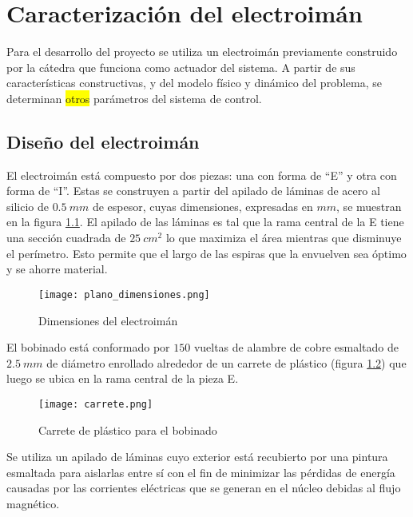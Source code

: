 \chapter{Caracterización del  electroimán}  \label{cap:CaracterizacionElectroiman}

\noindent Para el desarrollo del proyecto se utiliza un electroimán previamente construido por la cátedra que funciona como actuador del sistema. A partir de sus características constructivas, y del modelo físico y dinámico del problema, se determinan \colorbox{yellow}{otros} parámetros del sistema de control.

\section{Diseño del electroimán} \label{section_disenio_electroimán}



\noindent El electroimán está compuesto por dos piezas: una con forma de “E” y otra con forma de “I”. Estas se construyen a partir del apilado de láminas de acero al silicio de $0.5\:mm$ de espesor, cuyas dimensiones, expresadas en $mm$, se muestran en la figura \ref{fig:img_plano_dimensiones}. El apilado de las láminas es tal que la rama central de la E tiene una sección cuadrada de $25\:cm^{2}$ lo que maximiza el área mientras que disminuye el perímetro. Esto permite que el largo de las espiras que la envuelven sea óptimo y se ahorre material.

\begin{figure}[H]
	\centering
	\texttt{[image: plano\_dimensiones.png]}
	\caption{Dimensiones del electroimán}
	\label{fig:img_plano_dimensiones}
\end{figure}

\noindent El bobinado está conformado por $150$ vueltas de alambre de cobre esmaltado de $2.5\:mm$ de diámetro enrollado alrededor de un carrete de plástico (figura \ref{fig:img_carrete}) que luego se ubica en la rama central de la pieza E.

\begin{figure}[H]
	\centering
	\texttt{[image: carrete.png]}
	\caption{Carrete de plástico para el bobinado}
	\label{fig:img_carrete}
\end{figure}


\noindent Se utiliza un apilado de láminas cuyo exterior está recubierto por una pintura esmaltada para aislarlas entre sí con el fin de minimizar las pérdidas de energía causadas por las corrientes eléctricas que se generan en el núcleo debidas al flujo magnético. 

